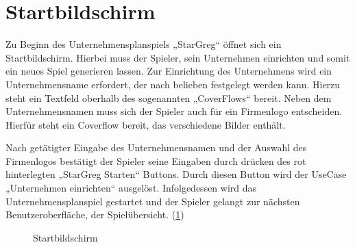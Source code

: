 \section{Startbildschirm}
\label{sec:ui-startbildschirm}

Zu Beginn des Unternehmensplanspiels „StarGreg“ öffnet sich ein Startbildschirm. Hierbei muss der Spieler, sein Unternehmen einrichten und somit ein neues Spiel generieren lassen. Zur Einrichtung des Unternehmens wird ein Unternehmensname erfordert, der nach belieben festgelegt werden kann. Hierzu steht ein Textfeld oberhalb des sogenannten „CoverFlows“ bereit. Neben dem Unternehmensnamen muss sich der Spieler auch für ein Firmenlogo entscheiden. Hierfür steht ein Coverflow bereit, das verschiedene Bilder enthält.
 
Nach getätigter Eingabe des Unternehmensnamen und der Auswahl des Firmenlogos bestätigt der Spieler seine Eingaben durch drücken des rot hinterlegten „StarGreg Starten“ Buttons. Durch diesen Button wird der UseCase „Unternehmen einrichten“ ausgelöst. Infolgedessen wird das Unternehmensplanspiel gestartet und der Spieler gelangt zur nächsten Benutzeroberfläche, der Spielübersicht. (\ref{img:ui-startbildschirm})

\begin{figure}[htb]
  \centering
  \caption{Startbildschirm}
  \label{img:ui-startbildschirm}
\end{figure}

\autorende{}
 
